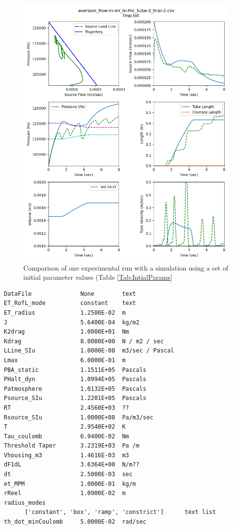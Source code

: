 \documentclass[letterpaper]{article}
\begin{document}
%
%




%
%

\begin{figure}\centering
\includegraphics[width=.75\textwidth]{Set6wInitialParams.png}
\caption{Comparison of one experimental run with a simulation using
a set of initial parameter values (Table \ref{Tab:IntialParams}}
\label{Fig:InitialSimCompare}
\end{figure}


\begin{verbatim}
DataFile              None        text
ET_RofL_mode          constant    text
ET_radius             1.2500E-02  m
J                     5.6400E-04  kg/m2
K2drag                1.0000E+01  Nm
Kdrag                 8.0000E+00  N / m2 / sec
LLine_SIu             1.0000E-08  m3/sec / Pascal
Lmax                  6.0000E-01  m
PBA_static            1.1511E+05  Pascals
PHalt_dyn             1.0994E+05  Pascals
Patmosphere           1.0132E+05  Pascals
Psource_SIu           1.2201E+05  Pascals
RT                    2.4560E+03  ??
Rsource_SIu           1.0000E+08  Pa/m3/sec
T                     2.9540E+02  K
Tau_coulomb           6.9400E-02  Nm
Threshold Taper       3.2319E+03  Pa /m
Vhousing_m3           1.4616E-03  m3
dF1dL                 3.6364E+00  N/m??
dt                    2.5000E-03  sec
et_MPM                1.0000E-01  kg/m
rReel                 1.0900E-02  m
radius_modes
      ['constant', 'box', 'ramp', 'constrict']      text list
th_dot_minCoulomb     5.0000E-02  rad/sec
\end{verbatim}
\end{document}
